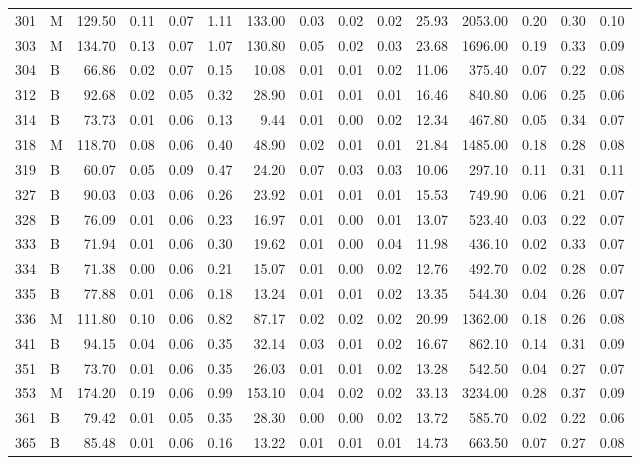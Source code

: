\begin{table}[ht]
\begin{tabular}{rlrrrrrrrrrrrrr}
  301 & M & 129.50 & 0.11 & 0.07 & 1.11 & 133.00 & 0.03 & 0.02 & 0.02 & 25.93 & 2053.00 & 0.20 & 0.30 & 0.10 \\ 
  303 & M & 134.70 & 0.13 & 0.07 & 1.07 & 130.80 & 0.05 & 0.02 & 0.03 & 23.68 & 1696.00 & 0.19 & 0.33 & 0.09 \\ 
  304 & B & 66.86 & 0.02 & 0.07 & 0.15 & 10.08 & 0.01 & 0.01 & 0.02 & 11.06 & 375.40 & 0.07 & 0.22 & 0.08 \\ 
  312 & B & 92.68 & 0.02 & 0.05 & 0.32 & 28.90 & 0.01 & 0.01 & 0.01 & 16.46 & 840.80 & 0.06 & 0.25 & 0.06 \\ 
  314 & B & 73.73 & 0.01 & 0.06 & 0.13 & 9.44 & 0.01 & 0.00 & 0.02 & 12.34 & 467.80 & 0.05 & 0.34 & 0.07 \\ 
  318 & M & 118.70 & 0.08 & 0.06 & 0.40 & 48.90 & 0.02 & 0.01 & 0.01 & 21.84 & 1485.00 & 0.18 & 0.28 & 0.08 \\ 
  319 & B & 60.07 & 0.05 & 0.09 & 0.47 & 24.20 & 0.07 & 0.03 & 0.03 & 10.06 & 297.10 & 0.11 & 0.31 & 0.11 \\ 
  327 & B & 90.03 & 0.03 & 0.06 & 0.26 & 23.92 & 0.01 & 0.01 & 0.01 & 15.53 & 749.90 & 0.06 & 0.21 & 0.07 \\ 
  328 & B & 76.09 & 0.01 & 0.06 & 0.23 & 16.97 & 0.01 & 0.00 & 0.01 & 13.07 & 523.40 & 0.03 & 0.22 & 0.07 \\ 
  333 & B & 71.94 & 0.01 & 0.06 & 0.30 & 19.62 & 0.01 & 0.00 & 0.04 & 11.98 & 436.10 & 0.02 & 0.33 & 0.07 \\ 
  334 & B & 71.38 & 0.00 & 0.06 & 0.21 & 15.07 & 0.01 & 0.00 & 0.02 & 12.76 & 492.70 & 0.02 & 0.28 & 0.07 \\ 
  335 & B & 77.88 & 0.01 & 0.06 & 0.18 & 13.24 & 0.01 & 0.01 & 0.02 & 13.35 & 544.30 & 0.04 & 0.26 & 0.07 \\ 
  336 & M & 111.80 & 0.10 & 0.06 & 0.82 & 87.17 & 0.02 & 0.02 & 0.02 & 20.99 & 1362.00 & 0.18 & 0.26 & 0.08 \\ 
  341 & B & 94.15 & 0.04 & 0.06 & 0.35 & 32.14 & 0.03 & 0.01 & 0.02 & 16.67 & 862.10 & 0.14 & 0.31 & 0.09 \\ 
  351 & B & 73.70 & 0.01 & 0.06 & 0.35 & 26.03 & 0.01 & 0.01 & 0.02 & 13.28 & 542.50 & 0.04 & 0.27 & 0.07 \\ 
  353 & M & 174.20 & 0.19 & 0.06 & 0.99 & 153.10 & 0.04 & 0.02 & 0.02 & 33.13 & 3234.00 & 0.28 & 0.37 & 0.09 \\ 
  361 & B & 79.42 & 0.01 & 0.05 & 0.35 & 28.30 & 0.00 & 0.00 & 0.02 & 13.72 & 585.70 & 0.02 & 0.22 & 0.06 \\ 
  365 & B & 85.48 & 0.01 & 0.06 & 0.16 & 13.22 & 0.01 & 0.01 & 0.01 & 14.73 & 663.50 & 0.07 & 0.27 & 0.08 \\ 

\end{tabular}
\end{table}
